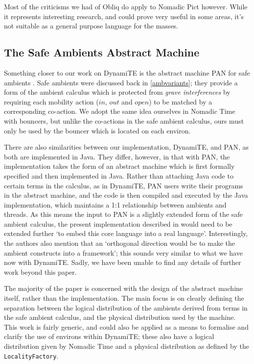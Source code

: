 Most of the criticisms we had of Obliq do apply to Nomadic Pict
however.  While it represents interesting research, and could prove
very useful in some areas, it's not suitable as a general purpose
language for the masses.

\subsection{The Safe Ambients Abstract Machine}

Something closer to our work on DynamiTE is the abstract machine PAN
for safe ambients \cite{sangiorgi:safeambientsmachine}.  Safe
ambients were discussed back in \ref{ambvariants}; they provide a form
of the ambient calculus which is protected from \emph{grave
  interferences} by requiring each mobility action ($in$, $out$ and
$open$) to be matched by a corresponding co-action.  We adopt the same
idea ourselves in Nomadic Time with bouncers, but unlike the
co-actions in the safe ambient calculus, ours must only be used by the
bouncer which is located on each environ.

There are also similarities between our implementation, DynamiTE, and
PAN, as both are implemented in Java.  They differ, however, in that
with PAN, the implementation takes the form of an abstract machine
which is first formally specified and then implemented in Java.
Rather than attaching Java code to certain terms in the calculus, as
in DynamiTE, PAN users write their programs in the abstract machine,
and the code is then compiled and executed by the Java implementation,
which maintains a 1:1 relationship between ambients and threads.  As
this means the input to PAN is a slightly extended form of the safe
ambient calculus, the present implementation described in
\cite{sangiorgi:safeambientsmachine} would need to be extended further
`to embed this core language into a real language'.  Interestingly,
the authors also mention that an `orthogonal direction would be to
make the ambient constructs into a framework'; this sounds very
similar to what we have now with DynamiTE.  Sadly, we have been unable
to find any details of further work beyond this paper.

The majority of the paper is concerned with the design of the abstract
machine itself, rather than the implementation.  The main focus is on
clearly defining the separation between the logical distribution of
the ambients derived from terms in the safe ambient calculus, and the
physical distribution used by the machine.  This work is fairly
generic, and could also be applied as a means to formalise and clarify
the use of environs within DynamiTE; these also have a logical
distribution given by Nomadic Time and a physical distribution as
defined by the \texttt{LocalityFactory}.

